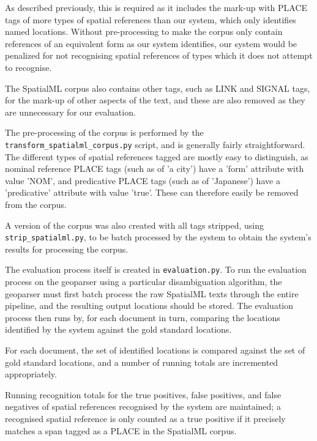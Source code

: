 \documentclass[12pt, a4paper]{report}
\begin{document}
As described previously, this is required as it includes the mark-up with PLACE tags of more types of spatial references than our system, which only identifies named locations. Without pre-processing to make the corpus only contain references of an equivalent form as our system identifies, our system would be penalized for not recognising spatial references of types which it does not attempt to recognise.

The SpatialML corpus also contains other tags, such as LINK and SIGNAL tags, for the mark-up of other aspects of the text, and these are also removed as they are unnecessary for our evaluation.

The pre-processing of the corpus is performed by the \verb#transform_spatialml_corpus.py# script, and is generally fairly straightforward. The different types of spatial references tagged are mostly easy to distinguish, as nominal reference PLACE tags (such as of 'a city') have a 'form' attribute with value 'NOM', and predicative PLACE tags (such as of 'Japanese') have a 'predicative' attribute with value 'true'. These can therefore easily be removed from the corpus.

A version of the corpus was also created with all tags stripped, using \verb#strip_spatialml.py#, to be batch processed by the system to obtain the system's results for processing the corpus.

The evaluation process itself is created in \verb#evaluation.py#. To run the evaluation process on the geoparser using a particular disambiguation algorithm, the geoparser must first batch process the raw SpatialML texts through the entire pipeline, and the resulting output locations should be stored. The evaluation process then runs by, for each document in turn, comparing the locations identified by the system against the gold standard locations.


For each document, the set of identified locations is compared against the set of gold standard locations, and a number of running totals are incremented appropriately.

Running recognition totals for the true positives, false positives, and false negatives of spatial references recognised by the system are maintained; a recognised spatial reference is only counted as a true positive if it precisely matches a span tagged as a PLACE in the SpatialML corpus.
\end{document}
